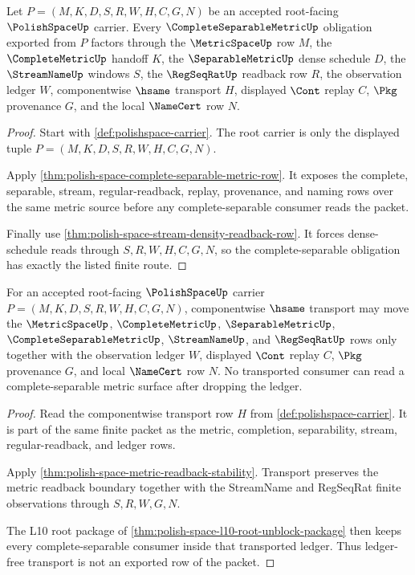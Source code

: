 \begin{theorem}
\label{thm:polishspace-separable-complete-metric-obligations}
Let $P=(M,K,D,S,R,W,H,C,G,N)$ be an accepted root-facing $\PolishSpaceUp$
carrier. Every $\CompleteSeparableMetricUp$ obligation exported from $P$
factors through the $\MetricSpaceUp$ row $M$, the $\CompleteMetricUp$ handoff
$K$, the $\SeparableMetricUp$ dense schedule $D$, the $\StreamNameUp$ windows
$S$, the $\RegSeqRatUp$ readback row $R$, the observation ledger $W$,
componentwise $\hsame$ transport $H$, displayed $\Cont$ replay $C$, $\Pkg$
provenance $G$, and the local $\NameCert$ row $N$.
\end{theorem}
\begin{proof}
Start with \autoref{def:polishspace-carrier}. The root carrier is only the
displayed tuple $P=(M,K,D,S,R,W,H,C,G,N)$.

Apply \autoref{thm:polish-space-complete-separable-metric-row}. It exposes the
complete, separable, stream, regular-readback, replay, provenance, and naming
rows over the same metric source before any complete-separable consumer reads
the packet.

Finally use \autoref{thm:polish-space-stream-density-readback-row}. It forces
dense-schedule reads through $S,R,W,H,C,G,N$, so the complete-separable
obligation has exactly the listed finite route.
\end{proof}

\begin{theorem}
\label{thm:polishspace-namecert-ledger-transport}
For an accepted root-facing $\PolishSpaceUp$ carrier
$P=(M,K,D,S,R,W,H,C,G,N)$, componentwise $\hsame$ transport may move the
$\MetricSpaceUp$, $\CompleteMetricUp$, $\SeparableMetricUp$,
$\CompleteSeparableMetricUp$, $\StreamNameUp$, and $\RegSeqRatUp$ rows only
together with the observation ledger $W$, displayed $\Cont$ replay $C$, $\Pkg$
provenance $G$, and local $\NameCert$ row $N$. No transported consumer can
read a complete-separable metric surface after dropping the ledger.
\end{theorem}
\begin{proof}
Read the componentwise transport row $H$ from
\autoref{def:polishspace-carrier}. It is part of the same finite packet as the
metric, completion, separability, stream, regular-readback, and ledger rows.

Apply \autoref{thm:polish-space-metric-readback-stability}. Transport preserves
the metric readback boundary together with the StreamName and RegSeqRat finite
observations through $S,R,W,G,N$.

The L10 root package of \autoref{thm:polish-space-l10-root-unblock-package}
then keeps every complete-separable consumer inside that transported ledger.
Thus ledger-free transport is not an exported row of the packet.
\end{proof}

